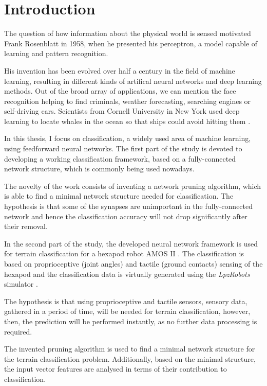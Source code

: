 \chapter{Introduction} \label{chap:introduction}
The question of how information about the physical world is sensed motivated Frank Rosenblatt in 1958, when he presented his perceptron, a model capable of learning and pattern recognition. 

His invention has been evolved over half a century in the field of machine learning, resulting in different kinds of artifical neural networks and deep learning methods. Out of the broad array of applications, we can mention the face recognition helping to find criminals, weather forecasting, searching engines or self-driving cars. Scientists from Cornell University in New York used deep learning to locate whales in the ocean so that ships could avoid hitting them \citep{misc:whales}.    

In this thesis, I focus on classification, a widely used area of machine learning, using feedforward neural networks. The first part of the study is devoted to developing a working classification framework, based on a fully-connected network structure, which is commonly being used nowadays. 

The novelty of the work consists of inventing a network pruning algorithm, which is able to find a minimal network structure needed for classification. The hypothesis is that some of the synapses are unimportant in the fully-connected network and hence the classification accuracy will not drop significantly after their removal.

In the second part of the study, the developed neural network framework is used for terrain classification for a hexapod robot AMOS II \citep{misc:amosii}. The classification is based on proprioceptive (joint angles) and tactile (ground contacts) sensing of the hexapod and the classification data is virtually generated using the \textit{LpzRobots} simulator \citep{misc:lpzrobots}.

The hypothesis is that using proprioceptive and tactile sensors, sensory data, gathered in a period of time, will be needed for terrain classification, however, then, the prediction will be performed instantly, as no further data processing is required.

The invented pruning algorithm is used to find a minimal network structure for the terrain classification problem. Additionally, based on the minimal structure, the input vector features are analysed in terms of their contribution to classification.

